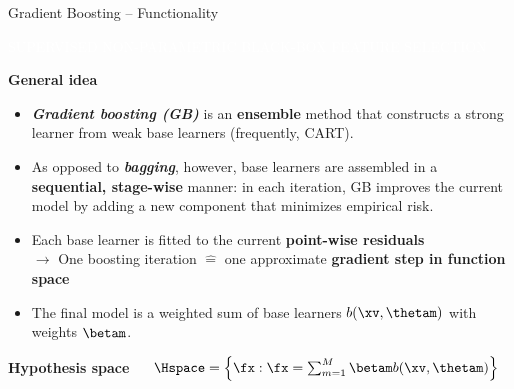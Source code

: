 \documentclass[11pt,compress,t,notes=noshow, xcolor=table]{beamer}
\newcommand{\bfit}[1]{\textbf{\textit{#1}}}
\newcommand{\maketag}[1]{\colorbox{highlightcol}{\textcolor{white}
{\MakeUppercase{#1}}}}
\newcommand{\highlight}[1]{\textcolor{highlightcol}{\textbf{#1}}}
\begin{document}
\begin{frame}{Gradient Boosting -- Functionality}

\footnotesize

\maketag{supervised}
\maketag{NON-PARAMETRIC}
\maketag{BLACK-BOX}
\maketag{FEATURE SELECTION}

\medskip

\highlight{General idea}

\begin{itemize}
  \item \bfit{Gradient boosting (GB)} is an \textbf{ensemble} method that 
  constructs a strong learner from weak base learners (frequently, CART).
  \item As opposed to \bfit{bagging}, however, base learners are assembled in a 
  \textbf{sequential, stage-wise} manner: in each iteration, GB improves the 
  current model by adding a new component that minimizes empirical risk.
  \item Each base learner is fitted to the current \textbf{point-wise residuals} 
  \\ $\rightarrow$ One boosting iteration $\widehat{=}$ one approximate 
  \textbf{gradient step in function space}
  \item The final model is a weighted sum of base learners $b(\xv, \thetam)$ 
  with weights $\betam$.
\end{itemize}

\medskip

\highlight{Hypothesis space} ~~
$\Hspace = \left\{ \fx: \fx = \sum_{m = 1}^M \betam b(\xv, \thetam) \right\}$

\medskip


\end{frame}
\end{document}
